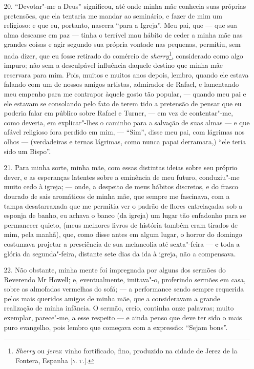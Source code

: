20. ``Devotar"-me a Deus'' significou, até onde minha mãe conhecia suas
próprias pretensões, que ela tentaria me mandar ao seminário, e fazer de
mim um religioso: e que eu, portanto, nascera ``para a Igreja''. Meu
pai, que --- que sua alma descanse em paz --- tinha o terrível mau hábito
de ceder a minha mãe nas grandes coisas e agir segundo sua própria
vontade nas pequenas, permitiu, sem nada dizer, que eu fosse retirado do
comércio de \emph{sherry}\footnote{\emph{Sherry} ou \emph{jerez}: vinho
  fortificado, fino, produzido na cidade de Jerez de la Fontera, Espanha
  {[}\textsc{n.\,t.}{]}.}, considerado como algo impuro; não sem a
desculpável influência daquele destino que minha mãe reservara para mim.
Pois, muitos e muitos anos depois, lembro, quando ele estava falando com
um de nossos amigos artistas, admirador de Rafael, e lamentando meu
empenho para me contrapor àquele gosto tão popular, --- quando meu pai e
ele estavam se consolando pelo fato de terem tido a pretensão de pensar
que eu poderia falar em público sobre Rafael e Turner, --- em vez de
contentar"-me, como deveria, em explicar"-lhes o caminho para a salvação
de suas almas --- e que afável religioso fora perdido em mim, --- ``Sim'',
disse meu pai, com lágrimas nos olhos --- (verdadeiras e ternas lágrimas,
como nunca papai derramara,) ``ele teria sido um Bispo''.

21. Para minha sorte, minha mãe, com essas distintas ideias sobre seu
próprio dever, e as esperanças latentes sobre a eminência de meu futuro,
conduziu"-me muito cedo à igreja; --- onde, a despeito de meus hábitos
discretos, e do frasco dourado de sais aromáticos de minha mãe, que
sempre me fascinava, com a tampa desatarraxada que me permitia ver o
padrão de flores entrelaçadas sob a esponja de banho, eu achava o banco
(da igreja) um lugar tão enfadonho para se permanecer quieto, (meus
melhores livros de história também eram tirados de mim, pela manhã),
que, como disse antes em algum lugar, o horror do domingo costumava
projetar a presciência de sua melancolia até sexta"-feira --- e toda a
glória da segunda"-feira, distante sete dias da ida à igreja, não a
compensava.

22. Não obstante, minha mente foi impregnada por alguns dos sermões do
Reverendo Mr Howell; e, eventualmente, imitava"-o, proferindo sermões em
casa, sobre as almofadas vermelhas do sofá; --- a performance sendo sempre
requerida pelos mais queridos amigos de minha mãe, que a consideravam a
grande realização de minha infância. O sermão, creio, continha onze
palavras; muito exemplar, parece"-me, a esse respeito --- e ainda penso
que deve ter sido o mais puro evangelho, pois lembro que começava com a
expressão: ``Sejam bons''.

